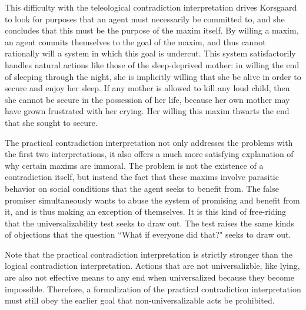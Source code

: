 \begin{isabellebody}
\begin{isamarkuptext}
This difficulty with the teleological contradiction interpretation drives Korsgaard to look for purposes
that an agent must necessarily be committed to, and she concludes that this must be the purpose of the 
maxim itself. By willing a maxim, an agent commits themselves to the goal of the maxim, and thus cannot 
rationally will a system in which this goal is undercut. This system satisfactorily handles natural actions
like those of the sleep-deprived mother: in willing the end of sleeping through the night, she is 
implicitly willing that she be alive in order to secure and enjoy her sleep. If any mother is allowed to kill
any loud child, then she cannot be secure in the possession of her life, because her own mother may have 
grown frustrated with her crying. Her willing this maxim thwarts the end that she sought to secure. 

The practical contradiction interpretation not only addresses the problems with the first two 
interpretations, it also offers a much more satisfying explanation of why certain maxims are immoral. 
The problem is not the existence of a contradiction itself, but instead the fact that these maxims 
involve parasitic behavior on social conditions that the agent seeks to benefit from. The false promiser 
simultaneously wants to abuse the system of promising and benefit from it, and is thus making an exception 
of themselves. It is this kind of free-riding that the universalizability test seeks to draw out. The test
raises the same kinds of objections that the question ``What if everyone did that?" seeks to draw out.

Note that the practical contradiction interpretation is strictly stronger than the logical contradiction
interpretation. Actions that are not universalizble, like lying, are also not effective means to any end
when universalized because they become impossible. Therefore, a formalization of the practical contradiction
interpretation must still obey the earlier goal that non-universalizable acts be prohibited.%
\end{isamarkuptext}\isamarkuptrue%
%
\isadelimtheory
%
\endisadelimtheory
%
\isatagtheory
%
\endisatagtheory
{\isafoldtheory}%
%
\isadelimtheory
%
\endisadelimtheory
%
\end{isabellebody}%
\endinput
